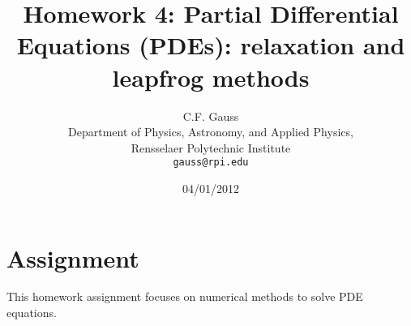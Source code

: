 \documentclass{report}
\begin{document}
\title{\textbf{Homework 4:} Partial Differential Equations (PDEs): relaxation and leapfrog methods}
\author{C.F. Gauss\\
  Department of Physics, Astronomy, and Applied Physics,\\
  Rensselaer Polytechnic Institute\\
  \texttt{gauss@rpi.edu}}
 \date{04/01/2012}
\maketitle
\section{Assignment}
This homework assignment focuses on numerical methods to solve PDE equations. 
\begin{enumerate}


\end{enumerate}
\end{document}
